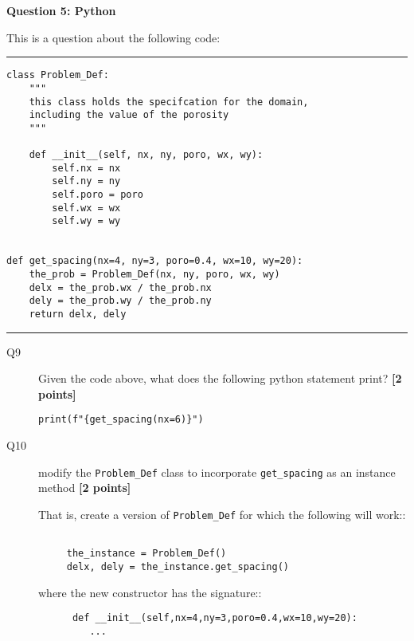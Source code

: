 \documentclass{article}
\begin{document}
\newpage
\textbf{Question 5: Python}


This is a question about the following code:

\rule{15cm}{0.75pt}


\begin{verbatim}
class Problem_Def:
    """
    this class holds the specifcation for the domain,
    including the value of the porosity
    """

    def __init__(self, nx, ny, poro, wx, wy):
        self.nx = nx
        self.ny = ny
        self.poro = poro
        self.wx = wx
        self.wy = wy


def get_spacing(nx=4, ny=3, poro=0.4, wx=10, wy=20):
    the_prob = Problem_Def(nx, ny, poro, wx, wy)
    delx = the_prob.wx / the_prob.nx
    dely = the_prob.wy / the_prob.ny
    return delx, dely
\end{verbatim}

\rule{15cm}{0.75pt}

\begin{description}

\item[Q9] Given the code above, what does the following python statement print?
  \textbf{[2 points]}
  
\verb+print(f"{get_spacing(nx=6)}")+

\vspace{1.5cm}
  
\end{description}


\begin{description}  

  
\item[Q10] modify the \verb+Problem_Def+ class to
  incorporate \verb+get_spacing+ as an instance method \textbf{[2 points]}

  That is, create a version of \verb+Problem_Def+ for which the following will work::

\begin{verbatim}

     the_instance = Problem_Def()
     delx, dely = the_instance.get_spacing()

\end{verbatim}

where the new constructor has the signature::

\begin{verbatim}
      def __init__(self,nx=4,ny=3,poro=0.4,wx=10,wy=20):
         ...
\end{verbatim}

  
\end{description}  
\end{document}
